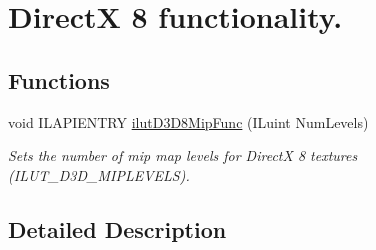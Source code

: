 \hypertarget{group__ilut__dx8}{\section{Direct\+X 8 functionality.}
\label{group__ilut__dx8}
}
\subsection*{Functions}
\begin{DoxyCompactItemize}
\item 
\hypertarget{group__ilut__dx8_ga8e8160f8c33ba5196a0df27619fa9240}{void I\+L\+A\+P\+I\+E\+N\+T\+R\+Y \hyperlink{group__ilut__dx8_ga8e8160f8c33ba5196a0df27619fa9240}{ilut\+D3\+D8\+Mip\+Func} (I\+Luint Num\+Levels)}\label{group__ilut__dx8_ga8e8160f8c33ba5196a0df27619fa9240}

\begin{DoxyCompactList}\small\item\em Sets the number of mip map levels for Direct\+X 8 textures (I\+L\+U\+T\+\_\+\+D3\+D\+\_\+\+M\+I\+P\+L\+E\+V\+E\+L\+S). \end{DoxyCompactList}\end{DoxyCompactItemize}


\subsection{Detailed Description}
